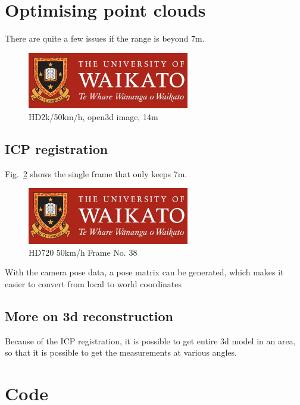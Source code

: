 \section{Optimising point clouds}

There are quite a few issues if the range is beyond 7m. 

\begin{figure}[htbp]
  \centerline{\includegraphics[width=200pt]{images/UoW.jpg}}
  \caption{HD2k/50km/h, open3d image, 14m}
  \label{fig30}
\end{figure}

\subsection{ICP registration}

Fig.~\ref{fig3a} shows the single frame that only keeps 7m.

\begin{figure}[htbp]
  \centerline{\includegraphics[width=200pt]{images/UoW.jpg}}
  \caption{HD720 50km/h Frame No. 38 }
  \label{fig3a}
\end{figure}

 With the camera pose data, a pose matrix can be generated, which makes it easier to convert from local to world coordinates

\subsection{More on 3d reconstruction}

Because of the ICP registration, it is possible to get entire 3d model in an area, so that it is possible to get the measurements at various angles.

\section{Code}

